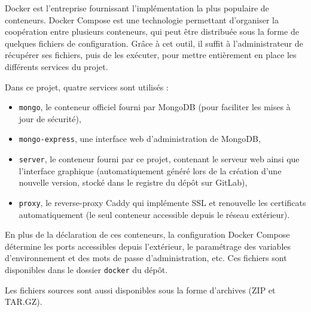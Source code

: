 Docker est l'entreprise fournissant l'implémentation la plus populaire de conteneurs.
Docker Compose est une technologie permettant d'organiser la coopération entre plusieurs conteneurs, qui peut être distribuée sous la forme de quelques fichiers de configuration.
Grâce à cet outil, il suffit à l'administrateur de récupérer ses fichiers, puis de les exécuter, pour mettre entièrement en place les différents services du projet.

Dans ce projet, quatre services sont utilisés :
\begin{itemize}
	\item \lstinline{mongo}, le conteneur officiel fourni par MongoDB (pour faciliter les mises à jour de sécurité),
	\item \lstinline{mongo-express}, une interface web d'administration de MongoDB,
	\item \lstinline{server}, le conteneur fourni par ce projet, contenant le serveur web ainsi que l'interface graphique (automatiquement généré lors de la création d'une nouvelle version, stocké dans le registre du dépôt sur GitLab),
	\item \lstinline{proxy}, le reverse-proxy Caddy qui implémente SSL et renouvelle les certificats automatiquement (le seul conteneur accessible depuis le réseau extérieur).
\end{itemize}
En plus de la déclaration de ces conteneurs, la configuration Docker Compose détermine les ports accessibles depuis l'extérieur, le paramétrage des variables d'environnement et des mots de passe d'administration, etc.
Ces fichiers sont disponibles dans le dossier \lstinline{docker} du dépôt.

Les fichiers sources sont aussi disponibles sous la forme d'archives (ZIP et TAR.GZ).
